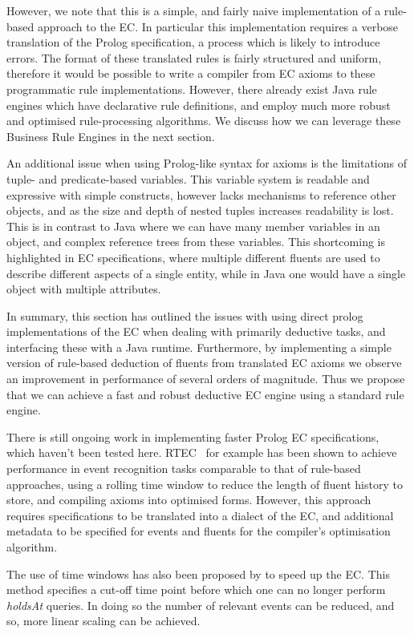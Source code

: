 However, we note that this is a simple, and fairly naive implementation of a
rule-based approach to the \ac{EC}. In particular this implementation requires
a verbose translation of the Prolog specification, a process which is likely
to introduce errors. The format of these translated rules is fairly structured
and uniform, therefore it would be possible to write a compiler from \ac{EC}
axioms to these programmatic rule implementations. However, there already
exist Java rule engines which have declarative rule definitions, and employ
much more robust and optimised rule-processing algorithms. We discuss how we
can leverage these Business Rule Engines in the next section.

An additional issue when using Prolog-like syntax for axioms is the
limitations of tuple- and predicate-based variables. This variable system is
readable and expressive with simple constructs, however lacks mechanisms to
reference other objects, and as the size and depth of nested tuples increases
readability is lost. This is in contrast to Java where we can have many member
variables in an object, and complex reference trees from these variables. This
shortcoming is highlighted in \ac{EC} specifications, where multiple different
fluents are used to describe different aspects of a single entity, while in
Java one would have a single object with multiple attributes.

In summary, this section has outlined the issues with using direct prolog
implementations of the \ac{EC} when dealing with primarily deductive tasks,
and interfacing these with a Java runtime. Furthermore, by implementing a
simple version of rule-based deduction of fluents from translated \ac{EC}
axioms we observe an improvement in performance of several orders of
magnitude. Thus we propose that we can achieve a fast and robust deductive
\ac{EC} engine using a standard rule engine.

There is still ongoing work in implementing faster Prolog \ac{EC}
specifications, which haven't been tested here. RTEC~\citep{Artikis2012} for
example has been shown to achieve performance in event recognition tasks
comparable to that of rule-based approaches, using a rolling time window to
reduce the length of fluent history to store, and compiling axioms into
optimised forms. However, this approach requires specifications to be
translated into a dialect of the \ac{EC}, and additional metadata to be
specified for events and fluents for the compiler's optimisation algorithm.

The use of time windows has also been proposed by \citet{Carr2010} to speed up
the \ac{EC}. This method specifies a cut-off time point before which one can
no longer perform \emph{holdsAt} queries. In doing so the number of relevant
events can be reduced, and so, more linear scaling can be achieved.

